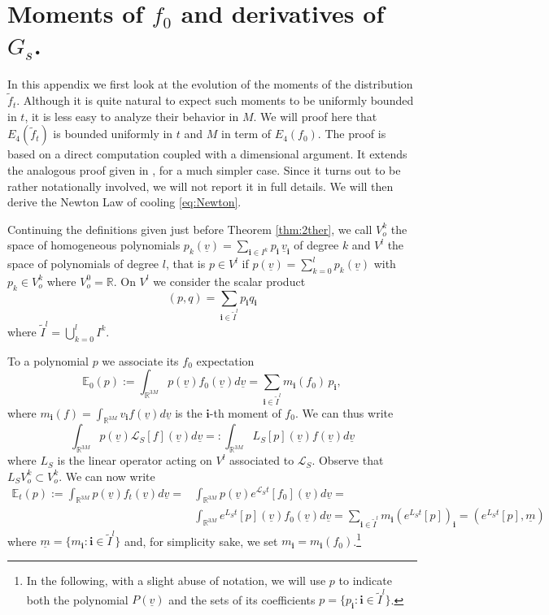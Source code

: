 \documentclass{article}
\newcommand*\R{ \mathds{R} }
\newcommand*\EXP{ \mathds{E} }
\newcommand*\cL{ \mathcal{L} }
\newcommand\uv{{\underline v}}
\begin{document}


\section{Moments of $f_0$ and derivatives of $\widehat G_s$.}\label{app:moments}

 In this appendix we first look at the evolution of the moments of the distribution $\tilde f_t$. Although it is quite
natural to expect such moments to be uniformly bounded in $t$, it is less easy to analyze their behavior in $M$. We
will proof here that $E_4(\tilde f_t)$ is bounded uniformly in $t$ and $M$ in term of $E_4(f_0)$. The proof is based on
a direct computation coupled with a dimensional argument. It extends the analogous proof given in \cite{BLTV}, for a
much simpler case. Since it turns out to be rather notationally involved, we will not report it in full details. We
will then derive the Newton Law of cooling \eqref{eq:Newton}.

Continuing the definitions given just before Theorem \ref{thm:2ther}, we call $V^k_o$ the space of homogeneous
polynomials $p_k(\uv)=\sum_{\mathbf i\in I^k}p_{\mathbf i}\,\uv_{\mathbf i}$ of degree $k$ and $V^l$ the space of
polynomials of degree $l$, that is $p\in V^l$ if $p(\uv)=\sum_{k=0}^l p_k(\uv)$ with $p_k\in V^k_o$ where $V_o^0=\mathds
R$. On $V^l$ we consider the scalar product
\begin{equation}\label{eq:prodP}
(p,q)=\sum_{\mathbf i\in \tilde I^l}p_{\mathbf i}q_{\mathbf i}
\end{equation}
where $\tilde I^l=\bigcup_{k=0}^l I^k$.

To a polynomial $p$ we associate its $f_0$ expectation
\[
\EXP_0(p):=\int_{\R^{3M}}p(\uv)f_0(\uv)d\uv=\sum_{\mathbf i\in \tilde I^l}m_{\mathbf i}(f_0)\,p_{\mathbf i},
\]
where $m_{\mathbf i}(f)=\int_{\R^{3M}}v_{\mathbf i}f(\uv)d\uv$ is the $\mathbf i$-th moment of $f_0$. We can thus write
\[
\int_{\R^{3M}}p(\uv) \cL_S[f](\uv)d\uv=:\int_{\R^{3M}} L_S[p](\uv) f(\uv)d\uv
\]
where $L_S$ is the linear operator acting on $V^l$ associated to $\mathcal L_S$. Observe that $L_SV^k_o\subset V^k_o$.  
We can now write
\begin{equation}
\begin{aligned}
\EXP_t(p):=\int_{\R^{3M}}p(\uv)f_t(\uv)d\uv=&\int_{\R^{3M}}p(\uv)e^{\cL_S t}[f_0](\uv)d\uv=\\
&\int_{\R^{3M}}e^{ L_S t}[p](\uv) f_0(\uv)d\uv=
\sum_{\mathbf i\in \tilde I^l}m_{\mathbf i}\left(e^{ L_S t}[p]\right)_{\mathbf i}=(e^{ L_S t}[p],\underline m)
\end{aligned}
\end{equation}
where $\underline m=\{m_{\mathbf i}: \mathbf i\in \tilde I^l\}$ and, for simplicity sake, we set $m_{\mathbf 
i}=m_{\mathbf i}(f_0)$.\footnote{In the following, with a slight abuse of notation, we will use $p$ to indicate both the
polynomial $P(\uv)$ and the sets of its coefficients $p=\{p_{\mathbf i}: \mathbf i\in \tilde I^l\}$.}
\end{document}
